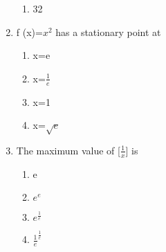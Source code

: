 \documentclass[12pt]{article}
\begin{document}
\begin{enumerate}
\begin{enumerate}
\item 32 
\end{enumerate}
\item f (x)=$x^2$ has a stationary point at
\begin{enumerate}
\item x=e
\item x=$\frac{1}{e}$
\item x=1
\item x=$\sqrt{e}$
\end{enumerate}
\item The maximum value of [$\frac{1}{x}$] is
\begin{enumerate}
\item e
\item $e^e$
\item $e^\frac{1}{e}$
\item $\frac{1}{e}^\frac{1}{e}$
\end{enumerate}
\end{enumerate}
\end{document}
